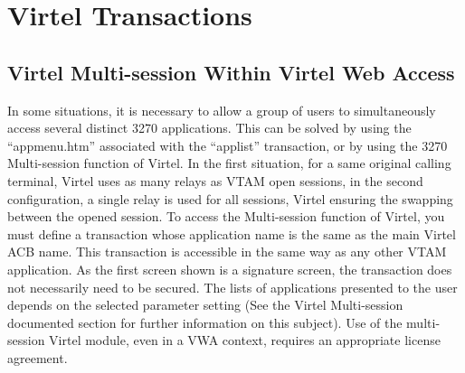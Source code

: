 \documentclass[letterpaper,10pt,english]{sphinxmanual}
\begin{document}
\ignorespaces 

\chapter{Virtel Transactions}
\label{\detokenize{Customization:virtel-transactions}}\label{\detokenize{Customization:index-61}}
\ignorespaces 

\section{Virtel Multi-session Within Virtel Web Access}
\label{\detokenize{Customization:virtel-multi-session-within-virtel-web-access}}\label{\detokenize{Customization:index-62}}
In some situations, it is necessary to allow a group of users to simultaneously access several distinct 3270 applications. This can be solved by using the “appmenu.htm” associated with the “applist” transaction, or by using the 3270 Multi-session function of Virtel. In the first situation, for a same original calling terminal, Virtel uses as many relays as VTAM open sessions, in the second configuration, a single relay is used for all sessions, Virtel ensuring the swapping between the opened session. To access the Multi-session function of Virtel, you must define a transaction whose application name is the same as the main Virtel ACB name. This transaction is accessible in the same way as any other VTAM application. As the first screen shown is a signature screen, the transaction does not necessarily need to be secured. The lists of applications presented to the user depends on the selected parameter setting (See the Virtel Multi-session documented section for further information on this subject). Use of the multi-session Virtel module, even in a VWA context, requires an appropriate license agreement.


\end{document}
